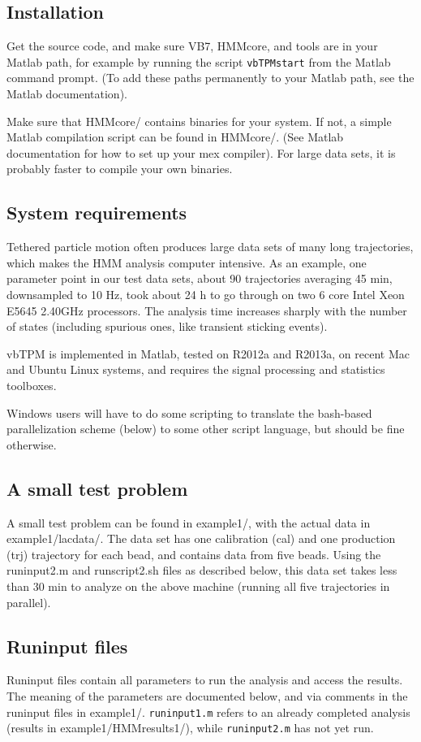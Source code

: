 \subsection{Installation}
Get the source code, and make sure VB7, HMMcore, and tools are in your
Matlab path, for example by running the script \verb+vbTPMstart+ from
the Matlab command prompt. (To add these paths permanently to your
Matlab path, see the Matlab documentation).

Make sure that HMMcore/ contains binaries for your system. If not, a
simple Matlab compilation script can be found in HMMcore/. (See Matlab
documentation for how to set up your mex compiler). For large data
sets, it is probably faster to compile your own binaries.

\subsection{System requirements}
Tethered particle motion often produces large data sets of many long
trajectories, which makes the HMM analysis computer intensive. As an
example, one parameter point in our test data sets, about 90
trajectories averaging 45 min, downsampled to 10 Hz, took about 24 h
to go through on two 6 core Intel Xeon E5645 2.40GHz processors. The
analysis time increases sharply with the number of states (including
spurious ones, like transient sticking events).

vbTPM is implemented in Matlab, tested on R2012a and R2013a, on recent
Mac and Ubuntu Linux systems, and requires the signal processing and
statistics toolboxes.

Windows users will have to do some scripting to translate the
bash-based parallelization scheme (below) to some other script
language, but should be fine otherwise.

\subsection{A small test problem}
A small test problem can be found in example1/, with the actual data
in example1/lacdata/.  The data set has one calibration (cal) and one
production (trj) trajectory for each bead, and contains data from five
beads. Using the runinput2.m and runscript2.sh files as described
below, this data set takes less than 30 min to analyze on the above
machine (running all five trajectories in parallel).

\subsection{Runinput files} 
Runinput files contain all parameters to run the analysis and access
the results. The meaning of the parameters are documented below, and
via comments in the runinput files in example1/.  \verb+runinput1.m+
refers to an already completed analysis (results in
example1/HMMresults1/), while \verb+runinput2.m+ has not yet run.

